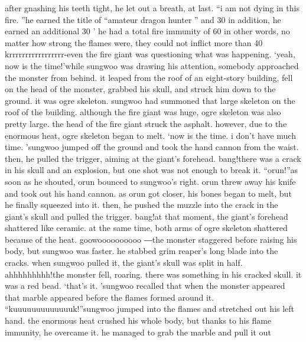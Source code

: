  after gnashing his teeth tight, he let out a breath, at last.
“i am not dying in this fire.
”he earned the title of “amateur dragon hunter ” and 30%
 in addition, he earned an additional 30%
’ he had a total fire immunity of 60%
in other words, no matter how strong the flames were, they could not inflict more than 40%
krrrrrrrrrrrrrrrrr-even the fire giant was questioning what was happening.
‘yeah, now is the time!’while sungwoo was drawing his attention, somebody approached the monster from behind.
it leaped from the roof of an eight-story building, fell on the head of the monster, grabbed his skull, and struck him down to the ground.
it was ogre skeleton.
 sungwoo had summoned that large skeleton on the roof of the building.
 although the fire giant was huge, ogre skeleton was also pretty large.
 the head of the fire giant struck the asphalt.
 however, due to the enormous heat, ogre skeleton began to melt.
‘now is the time.
 i don’t have much time.
’sungwoo jumped off the ground and took the hand cannon from the waist.
 then, he pulled the trigger, aiming at the giant’s forehead.
bang!there was a crack in his skull and an explosion, but one shot was not enough to break it.
“orun!”as soon as he shouted, orun bounced to sungwoo’s right.
 orun threw away his knife and took out his hand cannon.
as orun got closer, his bones began to melt, but he finally squeezed into it.
 then, he pushed the muzzle into the crack in the giant’s skull and pulled the trigger.
bang!at that moment, the giant’s forehead shattered like ceramic.
 at the same time, both arms of ogre skeleton shattered because of the heat.
goowoooooooooo ―the monster staggered before raising his body, but sungwoo was faster.
 he stabbed grim reaper’s long blade into the cracks.
when sungwoo pulled it, the giant’s skull was split in half.
ahhhhhhhhh!the monster fell, roaring.
 there was something in his cracked skull.
 it was a red bead.
‘that’s it.
’sungwoo recalled that when the monster appeared that marble appeared before the flames formed around it.
“kuuuuuuuuuuuuuk!”sungwoo jumped into the flames and stretched out his left hand.
 the enormous heat crushed his whole body, but thanks to his flame immunity, he overcame it.
 he managed to grab the marble and pull it out

